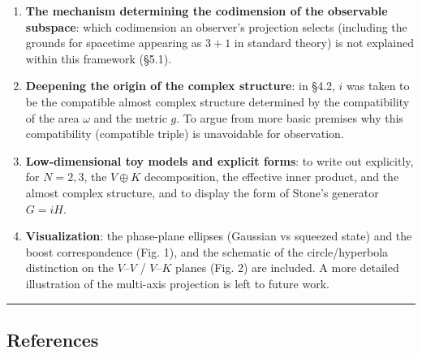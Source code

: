 \documentclass[
]{article}
\providecommand{\tightlist}{%
  \setlength{\itemsep}{0pt}\setlength{\parskip}{0pt}}
\begin{document}
\begin{enumerate}
\def\labelenumi{\arabic{enumi}.}
\tightlist
\item
  \textbf{The mechanism determining the codimension of the observable
  subspace}: which codimension an observer's projection selects
  (including the grounds for spacetime appearing as \(3+1\) in standard
  theory) is not explained within this framework (§5.1).
\item
  \textbf{Deepening the origin of the complex structure}: in §4.2, \(i\)
  was taken to be the compatible almost complex structure determined by
  the compatibility of the area \(\omega\) and the metric \(g\). To
  argue from more basic premises why this compatibility (compatible
  triple) is unavoidable for observation.
\item
  \textbf{Low-dimensional toy models and explicit forms}: to write out
  explicitly, for \(N=2,3\), the \(V\oplus K\) decomposition, the
  effective inner product, and the almost complex structure, and to
  display the form of Stone's generator \(G=iH\).
\item
  \textbf{Visualization}: the phase-plane ellipses (Gaussian vs squeezed
  state) and the boost correspondence (Fig. 1), and the schematic of the
  circle/hyperbola distinction on the \(V\)--\(V\) / \(V\)--\(K\) planes
  (Fig. 2) are included. A more detailed illustration of the multi-axis
  projection is left to future work.
\end{enumerate}

\begin{center}\rule{0.5\linewidth}{0.5pt}\end{center}

\subsection{References}\label{references}
\end{document}
